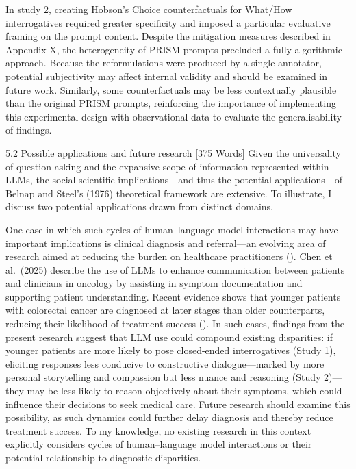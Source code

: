 \documentclass[
  12pt,
]{article}
\begin{document}
In study 2, creating Hobson's Choice counterfactuals for What/How interrogatives required greater specificity and imposed a particular evaluative framing on the prompt content. Despite the mitigation measures described in Appendix X, the heterogeneity of PRISM prompts precluded a fully algorithmic approach. Because the reformulations were produced by a single annotator, potential subjectivity may affect internal validity and should be examined in future work. Similarly, some counterfactuals may be less contextually plausible than the original PRISM prompts, reinforcing the importance of implementing this experimental design with observational data to evaluate the generalisability of findings.

5.2 Possible applications and future research {[}375 Words{]}
Given the universality of question-asking and the expansive scope of information represented within LLMs, the social scientific implications---and thus the potential applications---of Belnap and Steel's (1976) theoretical framework are extensive. To illustrate, I discuss two potential applications drawn from distinct domains.

One case in which such cycles of human--language model interactions may have important implications is clinical diagnosis and referral---an evolving area of research aimed at reducing the burden on healthcare practitioners (). Chen et al.~(2025) describe the use of LLMs to enhance communication between patients and clinicians in oncology by assisting in symptom documentation and supporting patient understanding. Recent evidence shows that younger patients with colorectal cancer are diagnosed at later stages than older counterparts, reducing their likelihood of treatment success (). In such cases, findings from the present research suggest that LLM use could compound existing disparities: if younger patients are more likely to pose closed-ended interrogatives (Study 1), eliciting responses less conducive to constructive dialogue---marked by more personal storytelling and compassion but less nuance and reasoning (Study 2)---they may be less likely to reason objectively about their symptoms, which could influence their decisions to seek medical care. Future research should examine this possibility, as such dynamics could further delay diagnosis and thereby reduce treatment success. To my knowledge, no existing research in this context explicitly considers cycles of human--language model interactions or their potential relationship to diagnostic disparities.
\end{document}
